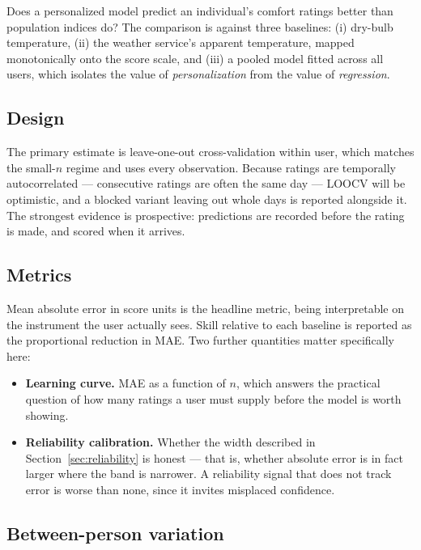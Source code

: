 \documentclass[11pt]{article}
\begin{document}
Does a personalized model predict an individual's comfort ratings better than
population indices do? The comparison is against three baselines: (i) dry-bulb
temperature, (ii) the weather service's apparent temperature, mapped
monotonically onto the score scale, and (iii) a pooled model fitted across all
users, which isolates the value of \emph{personalization} from the value of
\emph{regression}.

\subsection{Design}

The primary estimate is leave-one-out cross-validation within user, which
matches the small-$n$ regime and uses every observation. Because ratings are
temporally autocorrelated --- consecutive ratings are often the same day ---
LOOCV will be optimistic, and a blocked variant leaving out whole days is
reported alongside it. The strongest evidence is prospective: predictions are
recorded before the rating is made, and scored when it arrives.

\subsection{Metrics}

Mean absolute error in score units is the headline metric, being interpretable
on the instrument the user actually sees. Skill relative to each baseline is
reported as the proportional reduction in MAE. Two further quantities matter
specifically here:

\begin{itemize}
\item \textbf{Learning curve.} MAE as a function of $n$, which answers the
      practical question of how many ratings a user must supply before the
      model is worth showing.
\item \textbf{Reliability calibration.} Whether the width described in
      Section~\ref{sec:reliability} is honest --- that is, whether absolute
      error is in fact larger where the band is narrower. A reliability signal
      that does not track error is worse than none, since it invites misplaced
      confidence.
\end{itemize}

\subsection{Between-person variation}
\end{document}
